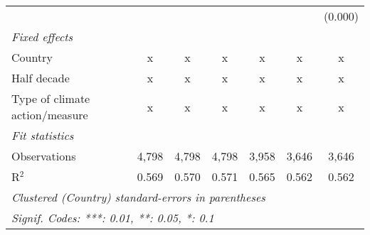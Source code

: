 \begin{tabular}{lcccccc}
                                                    &         &         &                &                &                & (0.000)\\   
   \emph{Fixed effects}\\
   Country                                          & x       & x       & x              & x              & x              & x\\  
   Half decade                                      & x       & x       & x              & x              & x              & x\\  
   Type of climate action/measure                   & x       & x       & x              & x              & x              & x\\  
   \midrule \emph{Fit statistics}\\
   Observations                                     & 4,798   & 4,798   & 4,798          & 3,958          & 3,646          & 3,646\\  
   R$^2$                                            & 0.569   & 0.570   & 0.571          & 0.565          & 0.562          & 0.562\\  
   \midrule
   \multicolumn{7}{l}{\emph{Clustered (Country) standard-errors in parentheses}}\\
   \multicolumn{7}{l}{\emph{Signif. Codes: ***: 0.01, **: 0.05, *: 0.1}}\\
\end{tabular}
\par\endgroup


